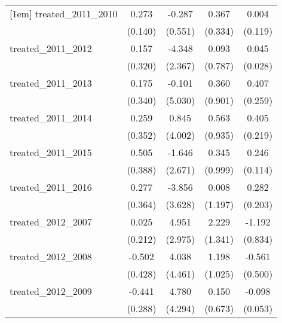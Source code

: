 {\begin{tabular}{l*{4}{c}}
[1em]
treated\_2011\_2010&       0.273         &      -0.287         &       0.367         &       0.004         \\
            &     (0.140)         &     (0.551)         &     (0.334)         &     (0.119)         \\
[1em]
treated\_2011\_2012&       0.157         &      -4.348         &       0.093         &       0.045         \\
            &     (0.320)         &     (2.367)         &     (0.787)         &     (0.028)         \\
[1em]
treated\_2011\_2013&       0.175         &      -0.101         &       0.360         &       0.407         \\
            &     (0.340)         &     (5.030)         &     (0.901)         &     (0.259)         \\
[1em]
treated\_2011\_2014&       0.259         &       0.845         &       0.563         &       0.405         \\
            &     (0.352)         &     (4.002)         &     (0.935)         &     (0.219)         \\
[1em]
treated\_2011\_2015&       0.505         &      -1.646         &       0.345         &       0.246\sym{*}  \\
            &     (0.388)         &     (2.671)         &     (0.999)         &     (0.114)         \\
[1em]
treated\_2011\_2016&       0.277         &      -3.856         &       0.008         &       0.282         \\
            &     (0.364)         &     (3.628)         &     (1.197)         &     (0.203)         \\
[1em]
treated\_2012\_2007&       0.025         &       4.951         &       2.229         &      -1.192         \\
            &     (0.212)         &     (2.975)         &     (1.341)         &     (0.834)         \\
[1em]
treated\_2012\_2008&      -0.502         &       4.038         &       1.198         &      -0.561         \\
            &     (0.428)         &     (4.461)         &     (1.025)         &     (0.500)         \\
[1em]
treated\_2012\_2009&      -0.441         &       4.780         &       0.150         &      -0.098         \\
            &     (0.288)         &     (4.294)         &     (0.673)         &     (0.053)         \\

\end{tabular}}
